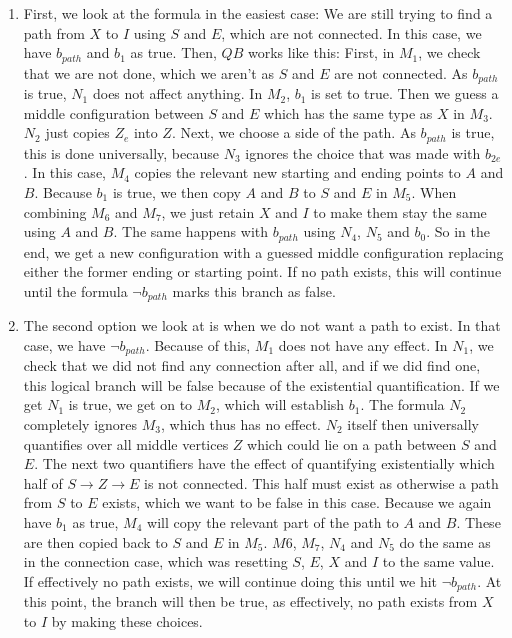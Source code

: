\begin{enumerate}
    \item First, we look at the formula in the easiest case: We are still trying to find a path from $X$ to $I$ using $S$ and $E$, which are not connected.
    In this case, we have $b_{path}$ and $b_1$ as true.
    Then, $QB$ works like this:
    First, in $M_1$, we check that we are not done, which we aren't as $S$ and $E$ are not connected.
    As $b_{path}$ is true, $N_1$ does not affect anything.
    In $M_2$, $b_1$ is set to true.
    Then we guess a middle configuration between $S$ and $E$ which has the same type as $X$ in $M_3$.
    $N_2$ just copies $Z_e$ into $Z$.
    Next, we choose a side of the path.
    As $b_{path}$ is true, this is done universally, because $N_3$ ignores the choice that was made with $b_{2e}$.
    In this case, $M_4$ copies the relevant new starting and ending points to $A$ and $B$.
    Because $b_1$ is true, we then copy $A$ and $B$ to $S$ and $E$ in $M_5$.
    When combining $M_6$ and $M_7$, we just retain $X$ and $I$ to make them stay the same using $A$ and $B$.
    The same happens with $b_{path}$ using $N_4$, $N_5$ and $b_0$.
    So in the end, we get a new configuration with a guessed middle configuration replacing either the former ending or starting point.
    If no path exists, this will continue until the formula $\neg b_{path}$ marks this branch as false.

    \item The second option we look at is when we do not want a path to exist.
    In that case, we have $\neg b_{path}$.
    Because of this, $M_1$ does not have any effect.
    In $N_1$, we check that we did not find any connection after all, and if we did find one, this logical branch will be false because of the existential quantification.
    If we get $N_1$ is true, we get on to $M_2$, which will establish $b_1$.
    The formula $N_2$ completely ignores $M_3$, which thus has no effect.
    $N_2$ itself then universally quantifies over all middle vertices $Z$ which could lie on a path between $S$ and $E$.
    The next two quantifiers have the effect of quantifying existentially which half of $S \to Z \to E$ is not connected.
    This half must exist as otherwise a path from $S$ to $E$ exists, which we want to be false in this case.
    Because we again have $b_1$ as true, $M_4$ will copy the relevant part of the path to $A$ and $B$.
    These are then copied back to $S$ and $E$ in $M_5$.
    $M6$, $M_7$, $N_4$ and $N_5$ do the same as in the connection case, which was resetting $S$, $E$, $X$ and $I$ to the same value.
    If effectively no path exists, we will continue doing this until we hit $\neg b_{path}$.
    At this point, the branch will then be true, as effectively, no path exists from $X$ to $I$ by making these choices.


\end{enumerate}
